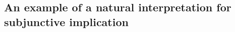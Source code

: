 \documentclass{llncs}
\numberwithin{equation}{section}
\begin{document}
\begin{comment}
\texttt{A paragraph about the phenomenon}

\texttt{A paragraph about the language}

\texttt{A paragraph about the system and consequence relation}

\texttt{A paragraph about its selfextensionality}












\subsubsection{Logic for resources and capability}

\texttt{A paragraph about the phenomenon}

\texttt{Reference, \cite{BiGrPaTz15}}

\texttt{A paragraph about the language}

\texttt{A paragraph about the system and consequence relation}

\texttt{A paragraph about its selfextensionality}

\end{comment}


























\subsection{An example of a natural interpretation for subjunctive implication}
\end{document}
